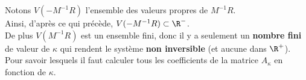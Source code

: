 \documentclass[12pt,a4paper]{article}
\begin{document}
\begin{enumerate}
	Notons $V(-M^{-1}R)$ l'ensemble des valeurs propres de $M^{-1}R$.\\
	Ainsi, d'après ce qui précède, $V(-M^{-1}R) \subset \R^-$.\\
	
	De plus $V(M^{-1}R)$ est un ensemble fini, donc il y a seulement un \textbf{nombre fini} de valeur de $\kappa$ qui rendent le système \textbf{non inversible} (et aucune dans $\R^+$).\\
	Pour savoir lesquels il faut calculer tous les coefficients de la matrice $A_\kappa$ en fonction de $\kappa$.
	
\end{enumerate}
	
\end{document}
